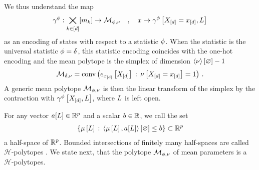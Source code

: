 We thus understand the map
\begin{align*}
    \gamma^{\phi} : \bigtimes_{k\in[d]}[m_{k}]\rightarrow\mathcal{M}_{\phi,\nu} \quad,\quad x \rightarrow \gamma^{\phi}\left[X_{[d]}=x_{[d]},L\right]
\end{align*}
as an encoding of states with respect to a statistic $\phi$.
When the statistic is the universal statistic $\phi=\delta$, this statistic encoding coincides with the one-hot encoding and the mean polytope is the simplex of dimension $\left\langle \nu\right\rangle \left[ \varnothing \right]-1$ %
\begin{align*}
    \mathcal{M}_{\delta,\nu}
    = \mathrm{conv}\left(e_{x_{[d]}}\left[X_{[d]}\right]\,:\,\nu\left[X_{[d]}=x_{[d]}\right]=1\right)\, .
\end{align*}
A generic mean polytope $\mathcal{M}_{\phi,\nu}$ is then the linear transform of the simplex by the contraction with $\gamma^{\phi}\left[X_{[d]},L\right]$, where $L$ is left open.%



For any vector $a[L]\in\mathbb{R}^{p}$ and a scalar $b\in\mathbb{R}$, we call the set
\begin{align*}
    \left\{\mu\left[L\right] \, : \, \left\langle \mu\left[L\right],a[L]\right\rangle \left[ \varnothing \right] \leq b \right\} \subset \mathbb{R}^{p}
\end{align*}
a half-space of $\mathbb{R}^p$.
Bounded intersections of finitely many half-spaces are called $\mathcal{H}$-polytopes \cite{ziegler_lectures_2013}.
We state next, that the polytope $\mathcal{M}_{\phi,\nu}$ of mean parameters is a $\mathcal{H}$-polytopes.


